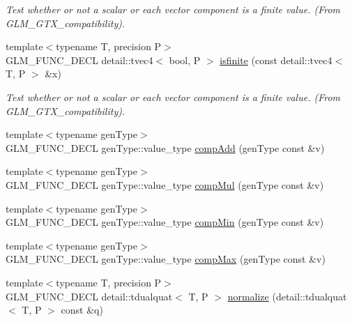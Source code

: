 \begin{CompactItemize}
\begin{CompactList}\small\item\em Test whether or not a scalar or each vector component is a finite value. (From GLM\_\-GTX\_\-compatibility). \item\end{CompactList}\item 
\hypertarget{group__gtx__compatibility_ge59390271d8c4e729b3c7bb42052108d}{
{\footnotesize template$<$typename T, precision P$>$ }\\GLM\_\-FUNC\_\-DECL detail::tvec4$<$ bool, P $>$ \hyperlink{group__gtx__compatibility_ge59390271d8c4e729b3c7bb42052108d}{isfinite} (const detail::tvec4$<$ T, P $>$ \&x)}
\label{group__gtx__compatibility_ge59390271d8c4e729b3c7bb42052108d}

\begin{CompactList}\small\item\em Test whether or not a scalar or each vector component is a finite value. (From GLM\_\-GTX\_\-compatibility). \item\end{CompactList}\item 
{\footnotesize template$<$typename genType$>$ }\\GLM\_\-FUNC\_\-DECL genType::value\_\-type \hyperlink{group__gtx__component__wise_gce15ba5120a9295e90f3c0f16f3cbaf7}{compAdd} (genType const \&v)
\item 
{\footnotesize template$<$typename genType$>$ }\\GLM\_\-FUNC\_\-DECL genType::value\_\-type \hyperlink{group__gtx__component__wise_gf6ecc951daaa8d0226bb6884919ae574}{compMul} (genType const \&v)
\item 
{\footnotesize template$<$typename genType$>$ }\\GLM\_\-FUNC\_\-DECL genType::value\_\-type \hyperlink{group__gtx__component__wise_ge4f6961924637c6e9fcdcd93498d9151}{compMin} (genType const \&v)
\item 
{\footnotesize template$<$typename genType$>$ }\\GLM\_\-FUNC\_\-DECL genType::value\_\-type \hyperlink{group__gtx__component__wise_gc32466f4e6405b6fdefc0fdfb5db77ec}{compMax} (genType const \&v)
\item 
{\footnotesize template$<$typename T, precision P$>$ }\\GLM\_\-FUNC\_\-DECL detail::tdualquat$<$ T, P $>$ \hyperlink{group__gtc__dual__quaternion_g861508468b4982401f1ae5b4919c5678}{normalize} (detail::tdualquat$<$ T, P $>$ const \&q)
\item 

\end{CompactItemize}
